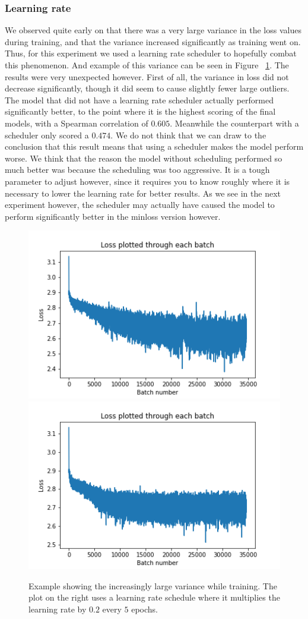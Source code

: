 \subsubsection{Learning rate}
We observed quite early on that there was a very large variance in the loss values during training, and that the variance increased significantly as training went on. Thus, for this experiment we used a learning rate scheduler to hopefully combat this phenomenon. And example of this variance can be seen in Figure ~\ref{fig:loss_var}. The results were very unexpected however. First of all, the variance in loss did not decrease significantly, though it did seem to cause slightly fewer large outliers. The model that did not have a learning rate scheduler actually performed significantly better, to the point where it is the highest scoring of the final models, with a Spearman correlation of $0.605$. Meanwhile the counterpart with a scheduler only scored a $0.474$. We do not think that we can draw to the conclusion that this result means that using a scheduler makes the model perform worse. We think that the reason the model without scheduling performed so much better was because the scheduling was too aggressive. It is a tough parameter to adjust however, since it requires you to know roughly where it is necessary to lower the learning rate for better results. As we see in the next experiment however, the scheduler may actually have caused the model to perform significantly better in the minloss version however.

\begin{figure}[!ht]
  \centering
  \includegraphics[width=0.5\linewidth]{latex/imgs/loss_log_1_layer_no_schedule_512.png}
  \includegraphics[width=0.5\linewidth]{latex/imgs/loss_log_1_layer_with_schedule_512.png}
  \caption{Example showing the increasingly large variance while training. The plot on the right uses a learning rate schedule where it multiplies the learning rate by $0.2$ every $5$ epochs.}
  \label{fig:loss_var}
\end{figure}

